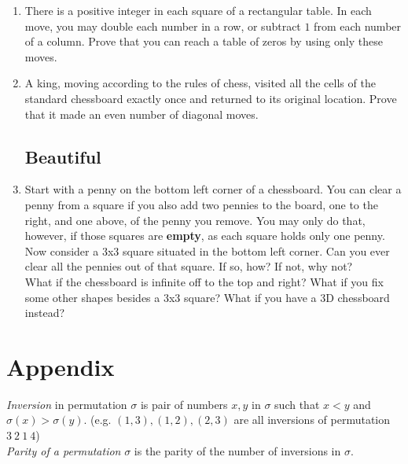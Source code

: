 \documentclass[11pt,a5paper]{article}
\begin{document}
\begin{enumerate}
	\item{There is a positive integer in each square of a rectangular table. In each move, you may double each number in a row, or subtract $1$ from each number of a column. Prove that you can reach a table of zeros by using only these moves.}
	
	\item{A king, moving according to the rules of chess, visited all the cells of the standard chessboard exactly once and returned to its original location. Prove that it made an even number of diagonal moves.}
	
	\subsection*{Beautiful}
	\item{Start with a penny on the bottom left corner of a chessboard.  You can clear a penny from a square if you also add two pennies to the board, one to the right, and one above, of the penny you remove.  You may only do that, however, if those squares are \textbf{empty}, as each square holds only one penny.\\
Now consider a 3x3 square situated in the bottom left corner.  Can you ever clear all the pennies out of that square.  If so, how?  If not, why not? \\
What if the chessboard is infinite off to the top and right?  What if you fix some other shapes besides a 3x3 square?  What if you have a 3D chessboard instead?}
\end{enumerate}

\section{Appendix}
\emph{Inversion} in permutation $\sigma$ is pair of numbers $x, y$ in $\sigma$ such that $x < y$ and $\sigma(x) > \sigma(y)$. (e.g. $(1,3), (1,2), (2,3)$ are all inversions of permutation $3\ 2\ 1\ 4$)\\
\noindent\emph{Parity of a permutation} $\sigma$ is the parity of the number of inversions in $\sigma$.\\
\end{document}

